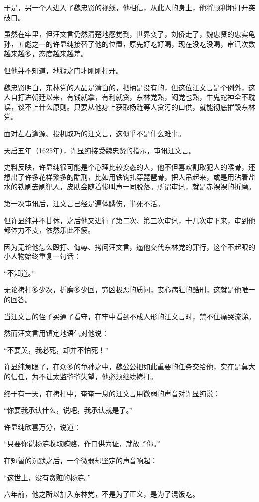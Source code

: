 \begin{multicols}{\theparacolNo}
于是，另一个人进入了魏忠贤的视线，他相信，从此人的身上，他将顺利地打开突破口。

虽然在牢里，但汪文言仍然清楚地感觉到，世界变了，刘侨走了，魏忠贤的忠实龟孙，五彪之一的许显纯接替了他的位置，原先好吃好喝，现在没吃没喝，审讯次数越来越多，态度越来越差。

但他并不知道，地狱之门才刚刚打开。

魏忠贤明白，东林党的人品是清白的，把柄是没有的，但这位汪文言是个例外，这人自打进朝廷以来，有钱就拿，有利就贪，东林党熟，阉党也熟，牛鬼蛇神全不耽误，谈不上什么原则。只要从他身上获取杨涟等人贪污的口供，就能彻底摧毁东林党。

面对左右逢源、投机取巧的汪文言，这似乎不是什么难事。

天启五年（1625年），许显纯接受魏忠贤的指示，审讯汪文言。

史料反映，许显纯很可能是个心理比较变态的人，他不但喜欢割取犯人的喉骨，还想出了许多花样繁多的酷刑，比如用铁钩扎穿琵琶骨，把人吊起来，或是用沾着盐水的铁刷去刷犯人，皮肤会随着惨叫声一同脱落。所谓审讯，就是赤裸裸的折磨。

第一次审讯后，汪文言已经是遍体鳞伤，半死不活。

但许显纯并不甘休，之后他又进行了第二次、第三次审讯，十几次审下来，审到他都体力不支，依然乐此不疲。

因为无论他怎么殴打、侮辱、拷问汪文言，逼他交代东林党的罪行，这个不起眼的小人物始终重复一句话：

“不知道。”

无论拷打多少次，折磨多少回，穷凶极恶的质问，丧心病狂的酷刑，这就是他唯一的回答。

当汪文言的侄子买通了看守，在牢中看到不成人形的汪文言时，禁不住痛哭流涕。

然而汪文言用镇定地语气对他说：

“不要哭，我必死，却并不怕死！”

许显纯急眼了，在众多的龟孙之中，魏公公把如此重要的任务交给他，实在是莫大的信任，为不让太监爷爷失望，他必须继续拷打。

终于有一天，在拷打中，奄奄一息的汪文言用微弱的声音对许显纯说：

“你要我承认什么，说吧，我承认就是了。”

许显纯欣喜万分，说道：

“只要你说杨涟收取贿赂，作口供为证，就放了你。”

在短暂的沉默之后，一个微弱却坚定的声音响起：

“这世上，没有贪赃的杨涟。”

六年前，他之所以加入东林党，不是为了正义，是为了混饭吃。


\end{multicols}
